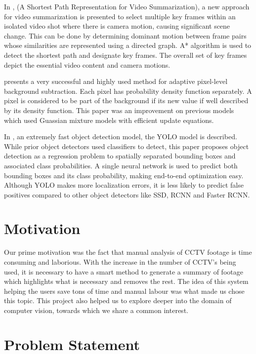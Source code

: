 In \cite{porter2003shortest}, (A Shortest Path Representation for Video Summarization), a new approach for video summarization is presented to select multiple key frames within an isolated video shot where there is camera motion, causing significant scene change. This can be done by determining dominant motion between frame pairs whose similarities are represented using a directed graph. A* algorithm is used to detect the shortest path and designate key frames. The overall set of key frames depict the essential video content and camera motions.

\cite{zivkovic2004improved} presents a very successful and highly used method for adaptive pixel-level background subtraction. Each pixel has probability density function separately. A pixel is considered to be part of the background if its new value if well described by its density function. This paper was an improvement on previous models which used Guassian mixture models with efficient update equations.

In \cite{redmon2016you}, an extremely fast object detection model, the YOLO model is described. While prior object detectors used classifiers to detect, this paper proposes object detection as a regression problem to spatially separated bounding boxes and associated class probabilities. A single neural network is used to predict both bounding boxes and its class probability, making end-to-end optimization easy. Although YOLO makes more localization errors, it is less likely to predict false positives compared to other object detectors like SSD, RCNN and Faster RCNN.

\section{Motivation}

Our prime motivation was the fact that manual analysis of CCTV footage is time consuming and laborious. With the increase in the number of CCTV’s being used, it is necessary to have a smart method to generate a summary of footage which highlights what is necessary and removes the rest. The idea of this system helping the users save tons of time and manual labour was what made us chose this topic. This project also helped us to explore deeper into the domain of computer vision, towards which we share a common interest.

\section{Problem Statement}

